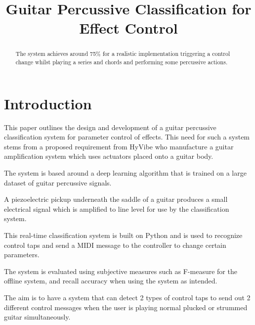 \documentclass[conference]{IEEEtran}
\begin{document}
\title{Guitar Percussive Classification for Effect Control\\

}

\author{
}

\maketitle

\begin{abstract}

    The system achieves around 75\% for a realistic implementation triggering a control change whilst playing a series and chords and performing some percussive actions.

\end{abstract}
 
\section{Introduction}
This paper outlines the design and development of a guitar percussive classification system for parameter control of effects. This need for such a system stems from a proposed
requirement from HyVibe who manufacture a guitar amplification system which uses actuators placed onto a guitar body.

The system is based around a deep learning algorithm that is trained on a large dataset of guitar percussive signals. 

A piezoelectric pickup underneath the saddle of a guitar produces a small electrical signal which is amplified to line level for use by the classification system.

This real-time classification system is built on Python and is used to recognize control taps and send a MIDI message to the controller to change certain parameters.

The system is evaluated using subjective measures such as F-measure for the offline system, and recall accuracy when using the system as intended.

The aim is to have a system that can detect 2 types of control taps to send out 2 different control messages when the user is playing normal plucked or strummed guitar simultaneously.
\end{document}
